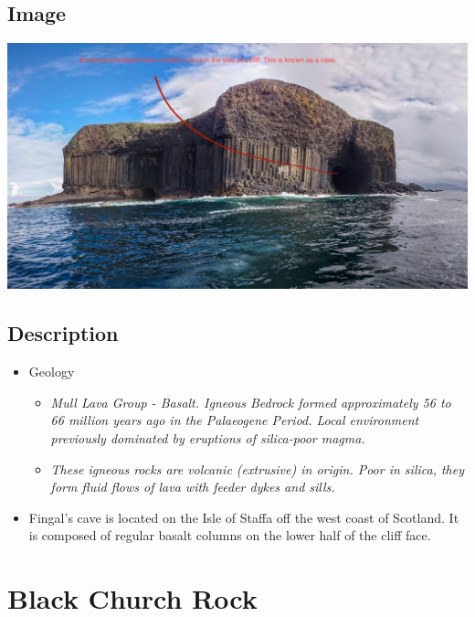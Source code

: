\documentclass[11pt]{article}
\begin{document}
\subsection{Image}
\label{sec:orgccfa781}
\begin{center}
\includegraphics[width=.9\linewidth]{Images/cave-image.jpg}
\end{center}

\subsection{Description}
\label{sec:orge3a5b7b}

\begin{itemize}
\item Geology 

\begin{itemize}
\item \emph{Mull Lava Group - Basalt. Igneous Bedrock formed approximately 56 to 66 million years ago in the Palaeogene Period. Local environment previously dominated by eruptions of silica-poor magma.}

\item \emph{These igneous rocks are volcanic (extrusive) in origin. Poor in silica, they form fluid flows of lava with feeder dykes and sills.}
\end{itemize}

\item Fingal's cave is located on the Isle of Staffa off the west coast of Scotland. It is composed of regular basalt columns on the lower half of the cliff face.
\end{itemize}

\section{Black Church Rock}
\label{sec:org928d6f2}
\end{document}
